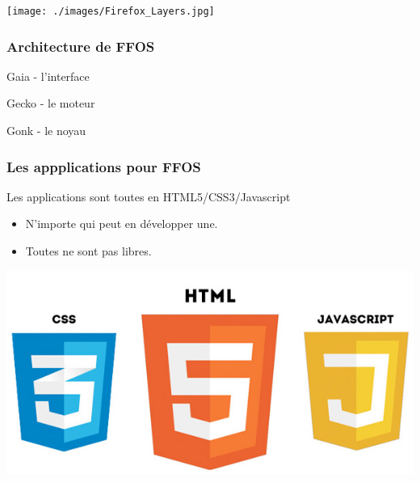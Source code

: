 \documentclass{beamer}
\begin{document}
\begin{frame}
\begin{center}
\texttt{[image: ./images/Firefox\_Layers.jpg]}
\end{center}
\end{frame}
\begin{frame}
\frametitle{Architecture de FFOS}
\begin{block}{Gaia - l'interface}
\end{block}
\begin{block}{Gecko - le moteur}
\end{block}
\begin{block}{Gonk - le noyau}
\end{block}
\end{frame}

\begin{frame}
\frametitle{Les appplications pour FFOS}
Les applications sont toutes en HTML5/CSS3/Javascript
\begin{itemize}
\item N'importe qui peut en développer une.
\item Toutes ne sont pas libres.
\end{itemize}

\begin{center}
\includegraphics[scale=0.3]{./images/logo-html5.jpg} 
\end{center}
\end{frame}
\end{document}

